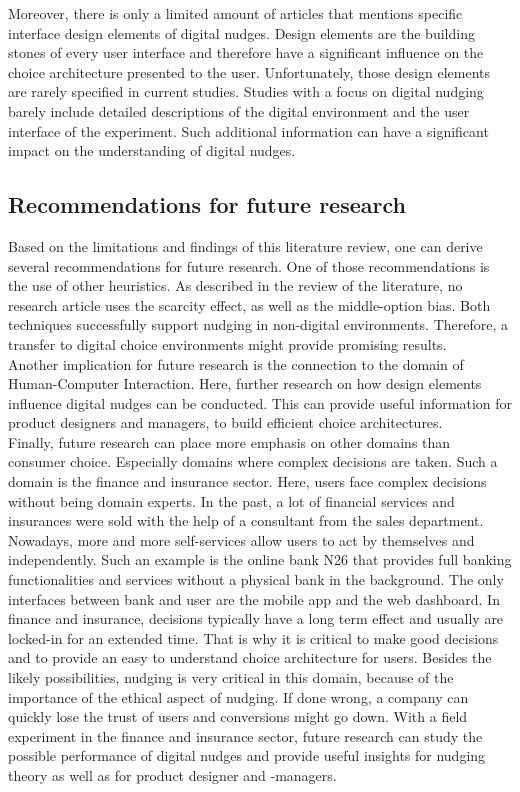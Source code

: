Moreover, there is only a limited amount of articles that mentions specific interface design elements of digital nudges. Design elements are the building stones of every user interface and therefore have a significant influence on the choice architecture presented to the user. Unfortunately, those design elements are rarely specified in current studies. Studies with a focus on digital nudging barely include detailed descriptions of the digital environment and the user interface of the experiment. Such additional information can have a significant impact on the understanding of digital nudges.
\\
 
\subsection{Recommendations for future research}
Based on the limitations and findings of this literature review, one can derive several recommendations for future research. One of those recommendations is the use of other heuristics. As described in the review of the literature, no research article uses the scarcity effect, as well as the middle-option bias. Both techniques successfully support nudging in non-digital environments. Therefore, a transfer to digital choice environments might provide promising results.
\\
 
Another implication for future research is the connection to the domain of Human-Computer Interaction. Here, further research on how design elements influence digital nudges can be conducted. This can provide useful information for product designers and managers, to build efficient choice architectures. 
 \\
 
Finally, future research can place more emphasis on other domains than consumer choice. Especially domains where complex decisions are taken. Such a domain is the finance and insurance sector. Here, users face complex decisions without being domain experts. In the past, a lot of financial services and insurances were sold with the help of a consultant from the sales department. Nowadays, more and more self-services allow users to act by themselves and independently. %
Such an example is the online bank N26 that provides full banking functionalities and services without a physical bank in the background. The only interfaces between bank and user are the mobile app and the web dashboard. In finance and insurance, decisions typically have a long term effect and usually are locked-in for an extended time. That is why it is critical to make good decisions and to provide an easy to understand choice architecture for users. Besides the likely possibilities, nudging is very critical in this domain, because of the importance of the ethical aspect of nudging. If done wrong, a company can quickly lose the trust of users and conversions might go down. With a field experiment in the finance and insurance sector, future research can study the possible performance of digital nudges and provide useful insights for nudging theory as well as for product designer and -managers.
